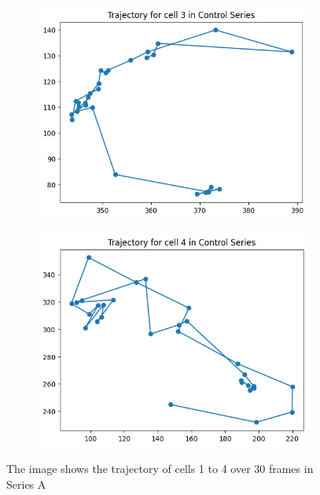 \documentclass{article}
\begin{document}
\begin{figure}[h!]
\begin{subfigure}[b]{0.5\linewidth}
    \end{subfigure}
    \begin{subfigure}[b]{0.5\linewidth}
        \centering
        \includegraphics[width=\linewidth]{Report/Appendix_Images/Trajectory-A-Control/trajectory_3.png}    
    \end{subfigure}%
    \begin{subfigure}[b]{0.5\linewidth}
        \centering
        \includegraphics[width=\linewidth]{Report/Appendix_Images/Trajectory-A-Control/trajectory_4.png}
    \end{subfigure}
    \caption{The image shows the trajectory of cells 1 to 4 over 30 frames in Series A}
    \label{fig:Trajectory-ControlSeries-1-4}
\end{figure}
\end{document}
